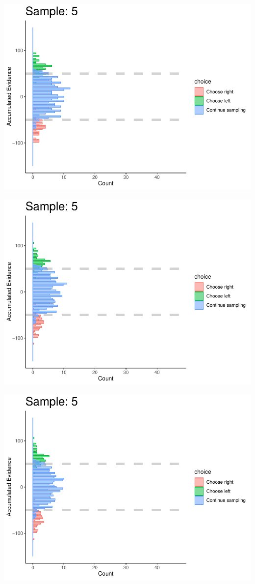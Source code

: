 \documentclass[
]{book}
\begin{document}
\begin{center}\includegraphics[width=0.8\linewidth]{LateNightBayes_files/figure-latex/fixed_check-46} \end{center}

\begin{center}\includegraphics[width=0.8\linewidth]{LateNightBayes_files/figure-latex/fixed_check-47} \end{center}

\begin{center}\includegraphics[width=0.8\linewidth]{LateNightBayes_files/figure-latex/fixed_check-48} \end{center}
\end{document}
